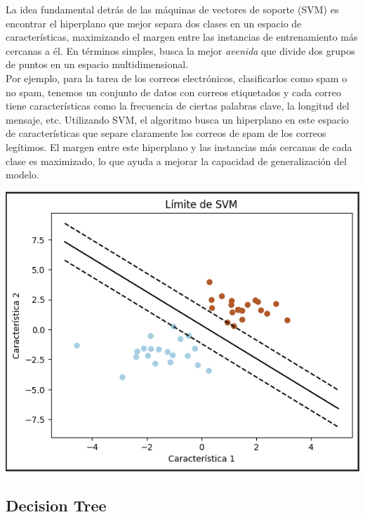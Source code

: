 La idea fundamental detrás de las máquinas de vectores de soporte (SVM) es encontrar el 
hiperplano que mejor separa dos clases en un espacio de características, maximizando el 
margen entre las instancias de entrenamiento más cercanas a él. En términos simples, busca 
la mejor \textit{avenida} que divide dos grupos de puntos en un espacio multidimensional.\\

Por ejemplo, para la tarea de los correos electrónicos, clasificarlos como spam o no spam, 
tenemos un conjunto de datos con correos etiquetados y cada correo tiene características 
como la frecuencia de ciertas palabras clave, la longitud del mensaje, etc. Utilizando SVM, 
el algoritmo busca un hiperplano en este espacio de características que separe claramente 
los correos de spam de los correos legítimos. El margen entre este hiperplano y las 
instancias más cercanas de cada clase es maximizado, lo que ayuda a mejorar la capacidad de 
generalización del modelo.\\

\begin{center}
    \includegraphics[scale = .5]{IMA/limiteSVM.png}
\end{center}

\subsection{Decision Tree}

